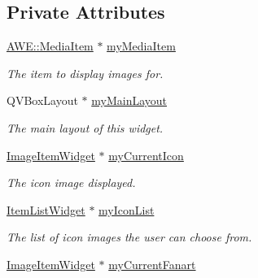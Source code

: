 \subsection*{Private Attributes}
\begin{DoxyCompactItemize}
\item 
\hypertarget{class_u_i_1_1_image_pane_a33fc6b4320346518e8fc04eba46944ba}{\hyperlink{class_a_w_e_1_1_media_item}{A\-W\-E\-::\-Media\-Item} $\ast$ \hyperlink{class_u_i_1_1_image_pane_a33fc6b4320346518e8fc04eba46944ba}{my\-Media\-Item}}\label{class_u_i_1_1_image_pane_a33fc6b4320346518e8fc04eba46944ba}

\begin{DoxyCompactList}\small\item\em The item to display images for. \end{DoxyCompactList}\item 
\hypertarget{class_u_i_1_1_image_pane_a17b7311739216de4089379e05cf9c59d}{Q\-V\-Box\-Layout $\ast$ \hyperlink{class_u_i_1_1_image_pane_a17b7311739216de4089379e05cf9c59d}{my\-Main\-Layout}}\label{class_u_i_1_1_image_pane_a17b7311739216de4089379e05cf9c59d}

\begin{DoxyCompactList}\small\item\em The main layout of this widget. \end{DoxyCompactList}\item 
\hypertarget{class_u_i_1_1_image_pane_abd90b87bb254cb8377f681d731974b49}{\hyperlink{class_u_i_1_1_image_item_widget}{Image\-Item\-Widget} $\ast$ \hyperlink{class_u_i_1_1_image_pane_abd90b87bb254cb8377f681d731974b49}{my\-Current\-Icon}}\label{class_u_i_1_1_image_pane_abd90b87bb254cb8377f681d731974b49}

\begin{DoxyCompactList}\small\item\em The icon image displayed. \end{DoxyCompactList}\item 
\hypertarget{class_u_i_1_1_image_pane_a1fd63418f1005a58a9f6b5fdb33802f2}{\hyperlink{class_u_i_1_1_item_list_widget}{Item\-List\-Widget} $\ast$ \hyperlink{class_u_i_1_1_image_pane_a1fd63418f1005a58a9f6b5fdb33802f2}{my\-Icon\-List}}\label{class_u_i_1_1_image_pane_a1fd63418f1005a58a9f6b5fdb33802f2}

\begin{DoxyCompactList}\small\item\em The list of icon images the user can choose from. \end{DoxyCompactList}\item 
\hypertarget{class_u_i_1_1_image_pane_a4a015fcb74110f915435c6da3c6d7f40}{\hyperlink{class_u_i_1_1_image_item_widget}{Image\-Item\-Widget} $\ast$ \hyperlink{class_u_i_1_1_image_pane_a4a015fcb74110f915435c6da3c6d7f40}{my\-Current\-Fanart}}\label{class_u_i_1_1_image_pane_a4a015fcb74110f915435c6da3c6d7f40}


\end{DoxyCompactItemize}
